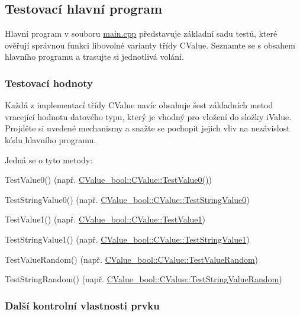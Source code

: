 \subsection*{Testovací hlavní program}

Hlavní program v souboru \hyperlink{main_8cpp}{main.\+cpp} představuje základní sadu testů, které ověřují správnou funkci libovolné varianty třídy {\ttfamily C\+Value}. Seznamte se s obsahem hlavního programu a trasujte si jednotlivá volání.

\subsubsection*{Testovací hodnoty}

Každá z implementací třídy {\ttfamily C\+Value} navíc obsahuje šest základních metod vracející hodnotu datového typu, který je vhodný pro vložení do složky {\ttfamily i\+Value}. Projděte si uvedené mechanismy a snažte se pochopit jejich vliv na nezávislost kódu hlavního programu.

Jedná se o tyto metody\+: \begin{DoxyItemize}
\item {\ttfamily Test\+Value0()} (např. \hyperlink{class_c_value__bool_1_1_c_value_a6a39f590a87bb4be8f707c032ca2b32b}{C\+Value\+\_\+bool\+::\+C\+Value\+::\+Test\+Value0()}) \item {\ttfamily Test\+String\+Value0()} (např. \hyperlink{class_c_value__bool_1_1_c_value_ae327d8276f5f4c75705c7413d5942ea0}{C\+Value\+\_\+bool\+::\+C\+Value\+::\+Test\+String\+Value0}) \item {\ttfamily Test\+Value1()} (např. \hyperlink{class_c_value__bool_1_1_c_value_a73b53a394f0b2ebeebeecad0610949b8}{C\+Value\+\_\+bool\+::\+C\+Value\+::\+Test\+Value1}) \item {\ttfamily Test\+String\+Value1()} (např. \hyperlink{class_c_value__bool_1_1_c_value_a2d82d7f212af01b330e3bc3514961a5a}{C\+Value\+\_\+bool\+::\+C\+Value\+::\+Test\+String\+Value1}) \item {\ttfamily Test\+Value\+Random()} (např. \hyperlink{class_c_value__bool_1_1_c_value_a5583585b33adfb3b27d9b49ad1a7cc3a}{C\+Value\+\_\+bool\+::\+C\+Value\+::\+Test\+Value\+Random}) \item {\ttfamily Test\+String\+Random()} (např. \hyperlink{class_c_value__bool_1_1_c_value_a84d39c7918bfb7876640a8b64e2e8c95}{C\+Value\+\_\+bool\+::\+C\+Value\+::\+Test\+String\+Value\+Random})\end{DoxyItemize}
\subsubsection*{Další kontrolní vlastnosti prvku}

